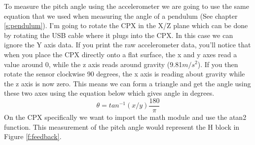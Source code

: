 To measure the pitch angle using the accelerometer we are going to use the same equation that we used when measuring the angle of a pendulum (See chapter \ref{s:pendulum}). I’m going to rotate the CPX in the X/Z plane which can be done by rotating the USB cable where it plugs into the CPX. In this case we can ignore the Y axis data. If you print the raw accelerometer data, you’ll notice that when you place the CPX directly onto a flat surface, the x and y axes read a value around 0, while the z axis reads around gravity (9.81$m/s^2$). If you then rotate the sensor clockwise 90 degrees, the x axis is reading about gravity while the z axis is now zero. This means we can form a triangle and get the angle using these two axes using the equation below which gives angle in degrees.
\begin{equation}
\theta = tan^{-1}(x/y)\frac{180}{\pi}
\end{equation}
On the CPX specifically we want to import the math module and use the atan2 function. This measurement of the pitch angle would represent the H block in Figure \ref{f:feedback}.

